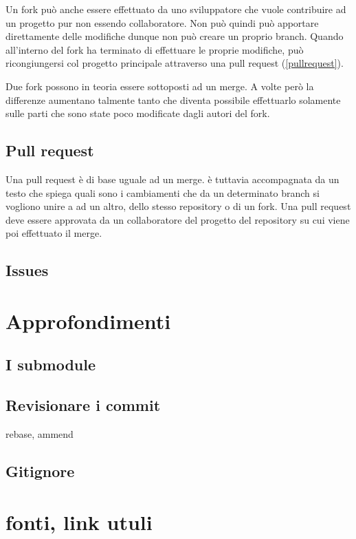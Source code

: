 \documentclass{article} \usepackage[textwidth=19cm,textheight=24cm]{geometry}
\begin{document}
Un fork può anche essere effettuato da uno sviluppatore che vuole contribuire ad
un progetto pur non essendo collaboratore. Non può quindi può apportare direttamente
delle modifiche dunque non può creare un proprio branch.
Quando all'interno del fork ha terminato di effettuare le proprie modifiche, può
ricongiungersi col progetto principale attraverso una pull request
({\ref{pullrequest}}).

Due fork possono in teoria essere sottoposti ad un merge. A volte però la
differenze aumentano talmente tanto che diventa possibile effettuarlo
solamente sulle parti che sono state poco modificate dagli autori del fork.

\subsection{Pull request\label{pullrequest}}
Una pull request è di base uguale ad un merge. è tuttavia accompagnata da un
testo che spiega quali sono i cambiamenti che da un determinato branch si
vogliono unire a ad un altro, dello stesso repository o di un fork.
Una pull request deve essere approvata da un collaboratore del progetto del
repository su cui viene poi effettuato il merge.

\subsection{Issues}

\section{Approfondimenti}

\subsection{I submodule}

\subsection{Revisionare i commit}

rebase, ammend

\subsection{Gitignore}

\section{fonti, link utuli}
\end{document}
